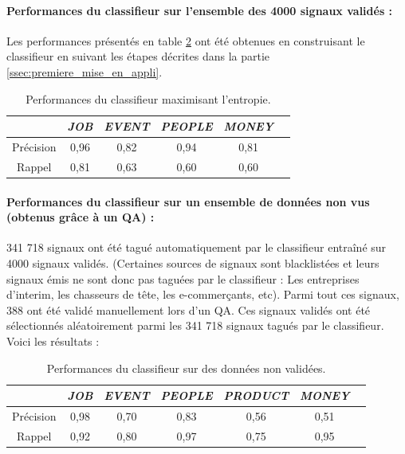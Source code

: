                 \paragraph{Performances du classifieur sur l'ensemble des 4000 signaux validés :}
                    Les performances présentés en table \ref{tab:classif_perf4} ont été obtenues en construisant le classifieur en suivant les étapes décrites dans la partie \ref{ssec:premiere_mise_en_appli}.
                    \begin{table}[t]
                        \centering
                        \begin{tabular}{| c | c | c | c | c | c |}
                            \hline
                             & \textit{JOB} & \textit{EVENT} & \textit{PEOPLE} & \textit{MONEY} \\
                            \hline
                            Précision & 0,96 & 0,82 & 0,94 & 0,81 \\
                            Rappel & 0,81 & 0,63 & 0,60 & 0,60 \\
                            \hline
                        \end{tabular}
                        \caption{Performances du classifieur maximisant l'entropie.}
                        \label{tab:classif_perf4}
                    \end{table}

                \paragraph{Performances du classifieur sur un ensemble de données non vus (obtenus grâce à un QA) :}
                    341 718 signaux ont été tagué automatiquement par le classifieur entraîné sur 4000 signaux validés.
                    (Certaines sources de signaux sont blacklistées et leurs signaux émis ne sont donc pas taguées par le classifieur : Les entreprises d'interim, les chasseurs de tête, les e-commerçants, etc). Parmi tout ces signaux, 388 ont été validé manuellement lors d'un QA. Ces signaux validés ont été sélectionnés aléatoirement parmi les 341 718 signaux tagués par le classifieur. Voici les résultats :
                    \begin{table}[t]
                        \centering
                        \begin{tabular}{| c | c | c | c | c | c | c |}
                            \hline
                             & \textit{JOB} & \textit{EVENT} & \textit{PEOPLE} & \textit{PRODUCT} & \textit{MONEY} \\
                            \hline
                            Précision & 0,98 & 0,70 & 0,83 & 0,56 & 0,51 \\
                            Rappel & 0,92 & 0,80 & 0,97 & 0,75 & 0,95 \\
                            \hline
                        \end{tabular}
                        \caption{Performances du classifieur sur des données non validées.}
                        \label{tab:classif_perf4}
                    \end{table}

